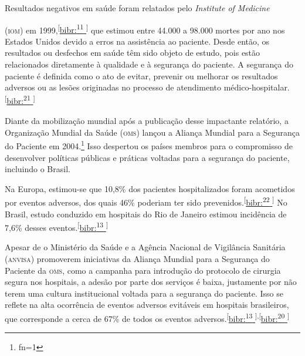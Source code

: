 \documentclass{article}
\makeatletter
\newcommand{\fn}{\afterassignment\fn@aux\count0=}
\newcommand{\fn@aux}{\csname fn\the\count0\endcsname}
\makeatother
\begin{document}
Resultados negativos em saúde foram relatados pelo \textit{Institute of
Medicine}

(\textsc{iom}) em 1999,\textsuperscript{[}\hyperlink{\textsuperscript{11}
}{bibr:\textsuperscript{11}
}\textsuperscript{]}
que estimou entre 44.000 a 98.000 mortes por ano nos Estados Unidos devido a
erros
na assistência ao paciente. Desde então, os resultados ou desfechos em saúde têm
sido objeto
de estudo, pois estão relacionados diretamente à qualidade e à segurança do
paciente. A
segurança do paciente é definida como o ato de evitar, prevenir ou melhorar os
resultados
adversos ou as lesões originadas no processo de atendimento médico-hospitalar.\textsuperscript{[}\hyperlink{\textsuperscript{21}
}{bibr:\textsuperscript{21}
}\textsuperscript{]}

Diante da mobilização mundial após a publicação desse impactante relatório, a
Organização
Mundial da Saúde (\textsc{oms}) lançou a Aliança Mundial para a Segurança do Paciente em
2004.\footnote{\fn1}
Isso despertou os países membros para o compromisso de desenvolver políticas
públicas e práticas voltadas para a segurança do paciente, incluindo o Brasil.

Na Europa, estimou-se que 10,8\% dos pacientes hospitalizados foram acometidos
por eventos
adversos, dos quais 46\% poderiam ter sido prevenidos.\textsuperscript{[}\hyperlink{\textsuperscript{22}
}{bibr:\textsuperscript{22}
}\textsuperscript{]}
No Brasil, estudo conduzido em hospitais do Rio de Janeiro estimou incidência de
7,6\% desses eventos.\textsuperscript{[}\hyperlink{\textsuperscript{13}
}{bibr:\textsuperscript{13}
}\textsuperscript{]}

Apesar de o Ministério da Saúde e a Agência Nacional de Vigilância Sanitária
(\textsc{anvisa})
promoverem iniciativas da Aliança Mundial para a Segurança do Paciente da \textsc{oms},
como a
campanha para introdução do protocolo de cirurgia segura nos hospitais, a adesão
por parte
dos serviços é baixa, justamente por não terem uma cultura institucional voltada
para a
segurança do paciente. Isso se reflete na alta ocorrência de eventos adversos
evitáveis em
hospitais brasileiros, que corresponde a cerca de 67\% de todos os eventos
adversos.\textsuperscript{[}\hyperlink{\textsuperscript{13}
}{bibr:\textsuperscript{13}
}\textsuperscript{]}\textsuperscript{,}\textsuperscript{[}\hyperlink{\textsuperscript{20}
}{bibr:\textsuperscript{20}
}\textsuperscript{]}
\end{document}
